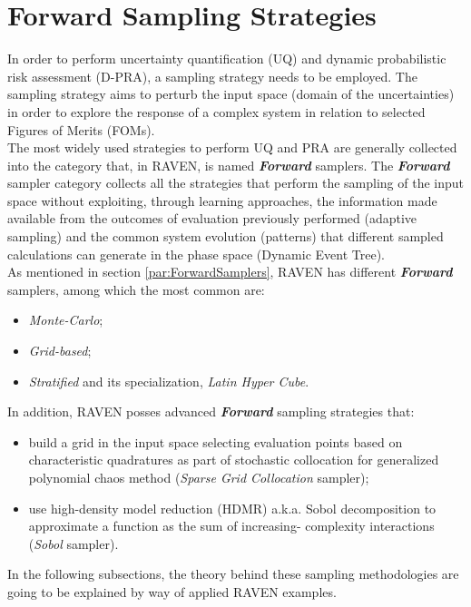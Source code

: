 \section{Forward Sampling Strategies}
\label{sec:forwardSamplingStrategies}
In order to perform uncertainty quantification (UQ) and dynamic
probabilistic risk assessment (D-PRA),
a sampling strategy needs to be employed. The sampling strategy aims to
perturb the input space (domain of the uncertainties) in order to explore
the response of a complex system in relation to selected Figures of 
Merits (FOMs). 
\\The most widely used strategies to perform UQ and PRA are generally
collected into the category that, in RAVEN, is named \textit{\textbf{Forward}} samplers. The \textit{\textbf{Forward}} sampler category collects all the strategies that perform the sampling of the input space without exploiting, through learning approaches, the information made available from the outcomes of evaluation previously performed (adaptive sampling) and the common system evolution (patterns) that different sampled calculations can generate in the phase space (Dynamic Event Tree). 
\\As mentioned in section \ref{par:ForwardSamplers}, RAVEN has
different \textit{\textbf{Forward}} samplers, among which the most 
common are:
\begin{itemize}
  \item \textit{Monte-Carlo};
  \item \textit{Grid-based};
  \item \textit{Stratified} and its specialization, \textit{Latin Hyper Cube}.
\end{itemize}
In addition, RAVEN posses advanced \textit{\textbf{Forward}} sampling strategies that:
\begin{itemize}
  \item build a grid in the input space selecting evaluation points 
  based on characteristic quadratures as part of stochastic collocation 
  for generalized polynomial chaos method (\textit{Sparse 
  Grid Collocation} sampler);
  \item use high-density model reduction (HDMR) a.k.a. Sobol 
  decomposition to approximate a function as the sum of increasing-
  complexity interactions (\textit{Sobol} sampler).
\end{itemize} 
In the following subsections, the theory behind these sampling 
methodologies are going to be explained by way of applied RAVEN 
examples.
